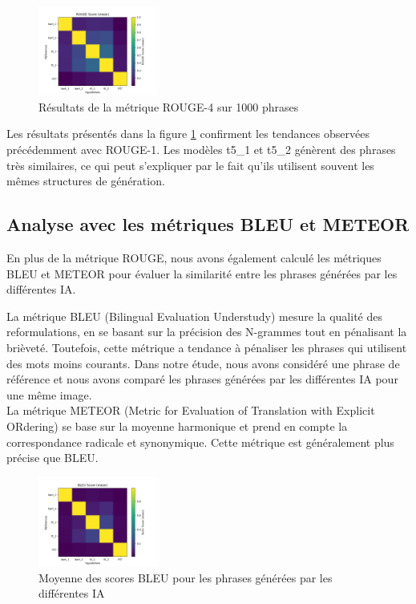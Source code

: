 \documentclass[conference]{IEEEtran}
\begin{document}
\begin{figure}[ht!]
\centering
\includegraphics[width=0.35\textwidth]{images/rouge_score_mean_4.png}
\caption{Résultats de la métrique ROUGE-4 sur 1000 phrases}
\label{fig:rouge_score_mean_4}
\end{figure}

Les résultats présentés dans la figure \ref{fig:rouge_score_mean_4} confirment les tendances observées précédemment avec ROUGE-1. Les modèles t5\_1 et t5\_2 génèrent des phrases très similaires, ce qui peut s'expliquer par le fait qu'ils utilisent souvent les mêmes structures de génération.

\subsection{Analyse avec les métriques BLEU et METEOR}

En plus de la métrique ROUGE, nous avons également calculé les métriques BLEU et METEOR pour évaluer la similarité entre les phrases générées par les différentes IA.

La métrique BLEU (Bilingual Evaluation Understudy) mesure la qualité des reformulations, en se basant sur la précision des N-grammes tout en pénalisant la brièveté. Toutefois, cette métrique a tendance à pénaliser les phrases qui utilisent des mots moins courants. Dans notre étude, nous avons considéré une phrase de référence et nous avons comparé les phrases générées par les différentes IA pour une même image.\\

La métrique METEOR (Metric for Evaluation of Translation with Explicit ORdering) se base sur la moyenne harmonique et prend en compte la correspondance radicale et synonymique. Cette métrique est généralement plus précise que BLEU.\\

\begin{figure}[htbp!]
\centering
\includegraphics[width=0.35\textwidth]{images/bleu_score_mean_1000.png}
\caption{Moyenne des scores BLEU pour les phrases générées par les différentes IA}
\label{fig}
\end{figure}
\end{document}
